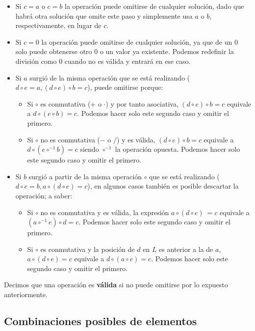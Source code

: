 \begin{itemize}
	\item Si $c = a$ o $c = b$ la operación puede omitirse de cualquier solución,
	dado que habrá otra solución que omite este paso y simplemente usa $a$ o $b$, respectivamente, en lugar de $c$.
	\item Si $c = 0$ la operación puede omitirse de cualquier solución, ya que de
	un 0 solo puede obtenerse otro 0 o un valor ya existente. Podemos redefinir
	la división como 0 cuando no es válida y entrará en ese caso.
	\item Si $a$ surgió de la misma operación que se está realizando
  ($d \circ e = a, (d \circ e) \circ b = c$),
  puede omitirse porque:
	\begin{itemize}
		\item Si $\circ$ es conmutativa ($+$ o $\cdot$) y por tanto asociativa,
		$(d \circ e) \circ b = c$ equivale a $d \circ (e \circ b) = c$.
		Podemos hacer solo este segundo caso y omitir el primero.
		\item Si $\circ$ no es conmutativa ($-$ o $/$) y es válida,
		$(d \circ e) \circ b = c$ equivale a $d \circ (e \circ^{-1} b) = c$
		siendo $\circ^{-1}$ la operación opuesta. Podemos hacer solo este segundo caso y omitir el primero.
	\end{itemize}
	\item Si $b$ surgió a partir de la misma operación $\circ$ que se está realizando
	($d \circ e = b, a \circ (d \circ e) = c$),
	en algunos casos también es posible descartar la operación; a saber:
	\begin{itemize}
		\item Si $\circ$ no es conmutativa y es válida, la expresión
		$a \circ (d \circ e)\ = c$ equivale a $(a \circ^{-1} e) \circ d = c$.
		Podemos hacer solo este segundo caso y omitir el primero.
		\item Si $\circ$ es conmutativa y la posición de $d$ en $L$ es anterior a la de $a$, $a \circ (d \circ e) = c$	equivale a $d \circ (a \circ e) = c$.
		Podemos hacer solo este segundo caso y omitir el primero.
	\end{itemize}
\end{itemize}

Decimos que una operación es \textbf{válida} si no puede omitirse por lo
expuesto anteriormente.

\subsection{Combinaciones posibles de elementos}

